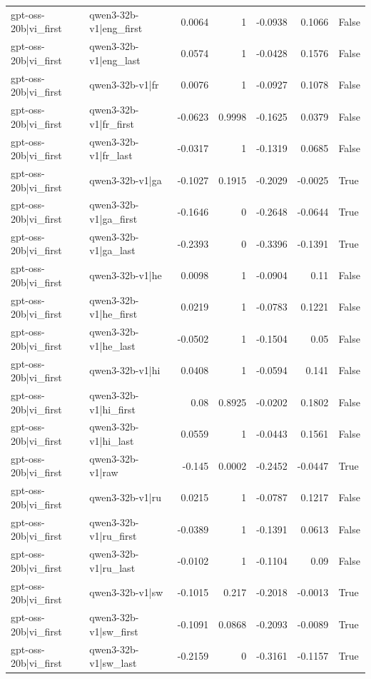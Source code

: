 \begin{table}
\begin{tabular}{l l r r r r l}
gpt-oss-20b|vi_first & qwen3-32b-v1|eng_first & 0.0064 & 1 & -0.0938 & 0.1066 & False \\
gpt-oss-20b|vi_first & qwen3-32b-v1|eng_last & 0.0574 & 1 & -0.0428 & 0.1576 & False \\
gpt-oss-20b|vi_first & qwen3-32b-v1|fr & 0.0076 & 1 & -0.0927 & 0.1078 & False \\
gpt-oss-20b|vi_first & qwen3-32b-v1|fr_first & -0.0623 & 0.9998 & -0.1625 & 0.0379 & False \\
gpt-oss-20b|vi_first & qwen3-32b-v1|fr_last & -0.0317 & 1 & -0.1319 & 0.0685 & False \\
gpt-oss-20b|vi_first & qwen3-32b-v1|ga & -0.1027 & 0.1915 & -0.2029 & -0.0025 & True \\
gpt-oss-20b|vi_first & qwen3-32b-v1|ga_first & -0.1646 & 0 & -0.2648 & -0.0644 & True \\
gpt-oss-20b|vi_first & qwen3-32b-v1|ga_last & -0.2393 & 0 & -0.3396 & -0.1391 & True \\
gpt-oss-20b|vi_first & qwen3-32b-v1|he & 0.0098 & 1 & -0.0904 & 0.11 & False \\
gpt-oss-20b|vi_first & qwen3-32b-v1|he_first & 0.0219 & 1 & -0.0783 & 0.1221 & False \\
gpt-oss-20b|vi_first & qwen3-32b-v1|he_last & -0.0502 & 1 & -0.1504 & 0.05 & False \\
gpt-oss-20b|vi_first & qwen3-32b-v1|hi & 0.0408 & 1 & -0.0594 & 0.141 & False \\
gpt-oss-20b|vi_first & qwen3-32b-v1|hi_first & 0.08 & 0.8925 & -0.0202 & 0.1802 & False \\
gpt-oss-20b|vi_first & qwen3-32b-v1|hi_last & 0.0559 & 1 & -0.0443 & 0.1561 & False \\
gpt-oss-20b|vi_first & qwen3-32b-v1|raw & -0.145 & 0.0002 & -0.2452 & -0.0447 & True \\
gpt-oss-20b|vi_first & qwen3-32b-v1|ru & 0.0215 & 1 & -0.0787 & 0.1217 & False \\
gpt-oss-20b|vi_first & qwen3-32b-v1|ru_first & -0.0389 & 1 & -0.1391 & 0.0613 & False \\
gpt-oss-20b|vi_first & qwen3-32b-v1|ru_last & -0.0102 & 1 & -0.1104 & 0.09 & False \\
gpt-oss-20b|vi_first & qwen3-32b-v1|sw & -0.1015 & 0.217 & -0.2018 & -0.0013 & True \\
gpt-oss-20b|vi_first & qwen3-32b-v1|sw_first & -0.1091 & 0.0868 & -0.2093 & -0.0089 & True \\
gpt-oss-20b|vi_first & qwen3-32b-v1|sw_last & -0.2159 & 0 & -0.3161 & -0.1157 & True \\

\end{tabular}
\end{table}
